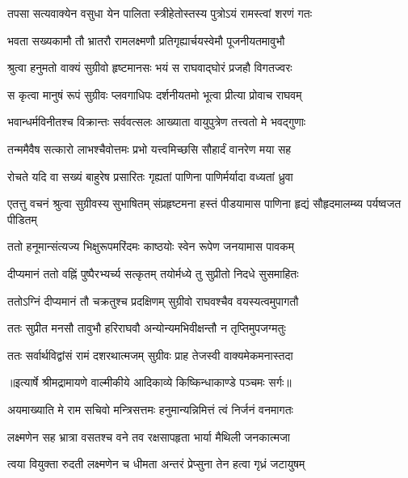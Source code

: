 \twolineshloka
{तपसा सत्यवाक्येन वसुधा येन पालिता}
{स्त्रीहेतोस्तस्य पुत्रोऽयं रामस्त्वां शरणं गतः} %

\twolineshloka
{भवता सख्यकामौ तौ भ्रातरौ रामलक्ष्मणौ}
{प्रतिगृह्यार्चयस्वेमौ पूजनीयतमावुभौ} %

\twolineshloka
{श्रुत्वा हनुमतो वाक्यं सुग्रीवो हृष्टमानसः}
{भयं स राघवाद्घोरं प्रजहौ विगतज्वरः} %

\twolineshloka
{स कृत्वा मानुषं रूपं सुग्रीवः प्लवगाधिपः}
{दर्शनीयतमो भूत्वा प्रीत्या प्रोवाच राघवम्} %

\twolineshloka
{भवान्धर्मविनीतश्च विक्रान्तः सर्ववत्सलः}
{आख्याता वायुपुत्रेण तत्त्वतो मे भवद्गुणाः} %

\twolineshloka
{तन्ममैवैष सत्कारो लाभश्चैवोत्तमः प्रभो}
{यत्त्वमिच्छसि सौहार्दं वानरेण मया सह} %

\twolineshloka
{रोचते यदि वा सख्यं बाहुरेष प्रसारितः}
{गृह्यतां पाणिना पाणिर्मर्यादा वध्यतां ध्रुवा} %

\threelineshloka
{एतत्तु वचनं श्रुत्वा सुग्रीवस्य सुभाषितम्}
{संप्रहृष्टमना हस्तं पीडयामास पाणिना}
{हृद्यं सौहृदमालम्ब्य पर्यष्वजत पीडितम्} %

\twolineshloka
{ततो हनूमान्संत्यज्य भिक्षुरूपमरिंदमः}
{काष्ठयोः स्वेन रूपेण जनयामास पावकम्} %

\twolineshloka
{दीप्यमानं ततो वह्निं पुष्पैरभ्यर्च्य सत्कृतम्}
{तयोर्मध्ये तु सुप्रीतो निदधे सुसमाहितः} %

\twolineshloka
{ततोऽग्निं दीप्यमानं तौ चक्रतुश्च प्रदक्षिणम्}
{सुग्रीवो राघवश्चैव वयस्यत्वमुपागतौ} %

\twolineshloka
{ततः सुप्रीत मनसौ तावुभौ हरिराघवौ}
{अन्योन्यमभिवीक्षन्तौ न तृप्तिमुपजग्मतुः} %

\twolineshloka
{ततः सर्वार्थविद्वांसं रामं दशरथात्मजम्}
{सुग्रीवः प्राह तेजस्वी वाक्यमेकमनास्तदा} %


{॥इत्यार्षे श्रीमद्रामायणे वाल्मीकीये आदिकाव्ये किष्किन्धाकाण्डे पञ्चमः सर्गः॥}


\twolineshloka
{अयमाख्याति मे राम सचिवो मन्त्रिसत्तमः}
{हनुमान्यन्निमित्तं त्वं निर्जनं वनमागतः} %

\twolineshloka
{लक्ष्मणेन सह भ्रात्रा वसतश्च वने तव}
{रक्षसापहृता भार्या मैथिली जनकात्मजा} %

\twolineshloka
{त्वया वियुक्ता रुदती लक्ष्मणेन च धीमता}
{अन्तरं प्रेप्सुना तेन हत्वा गृध्रं जटायुषम्} %

